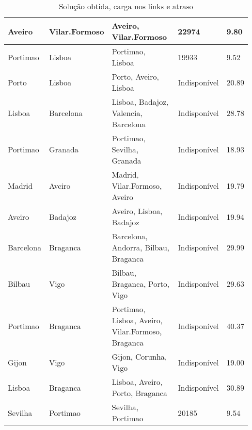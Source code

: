 \begin{table}[!htb]
{\begin{tabular}{|l|l|l|l|l|}
Aveiro & Vilar.Formoso & Aveiro, Vilar.Formoso & 22974 & 9.80 \\ \hline
Portimao & Lisboa & Portimao, Lisboa & 19933 & 9.52 \\ \hline
Porto & Lisboa & Porto, Aveiro, Lisboa & Indisponível & 20.89 \\ \hline
Lisboa & Barcelona & Lisboa, Badajoz, Valencia, Barcelona & Indisponível & 28.78 \\ \hline
Portimao & Granada & Portimao, Sevilha, Granada & Indisponível & 18.93 \\ \hline
Madrid & Aveiro & Madrid, Vilar.Formoso, Aveiro & Indisponível & 19.79 \\ \hline
Aveiro & Badajoz & Aveiro, Lisboa, Badajoz & Indisponível & 19.94 \\ \hline
Barcelona & Braganca & Barcelona, Andorra, Bilbau, Braganca & Indisponível & 29.99 \\ \hline
Bilbau & Vigo & Bilbau, Braganca, Porto, Vigo & Indisponível & 29.63 \\ \hline
Portimao & Braganca & Portimao, Lisboa, Aveiro, Vilar.Formoso, Braganca & Indisponível & 40.37 \\ \hline
Gijon & Vigo & Gijon, Corunha, Vigo & Indisponível & 19.00 \\ \hline
Lisboa & Braganca & Lisboa, Aveiro, Porto, Braganca & Indisponível & 30.89 \\ \hline
Sevilha & Portimao & Sevilha, Portimao & 20185 & 9.54 \\ \hline
\end{tabular}}
\caption[]{Solução obtida, carga nos links e atraso}
\end{table}

